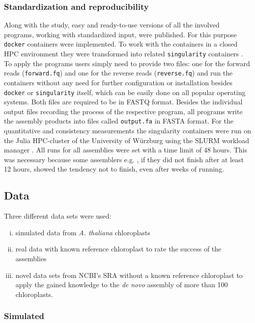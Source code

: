 \subsubsection{Standardization and reproducibility}

Along with the study, easy and ready-to-use versions of all the involved programs, working
with standardized input, were published. For this purpose \texttt{docker} containers
\cite{merkel2014docker} were implemented. To work with the containers in a closed HPC
environment they were transformed into related \texttt{singularity} containers
\cite{kurtzer2017singularity}. To apply the programs users simply need to provide two files:
one for the forward reads (\texttt{forward.fq}) and one for the reverse reads
(\texttt{reverse.fq}) and run the containers without any need for further configuration or
installation besides \texttt{docker} or \texttt{singularity} itself, which can be easily
done on all popular operating systems. Both files are required to be in FASTQ
format. Besides the individual output files recording the process of the respective
program, all programs write the assembly products into files called \texttt{output.fa} in
FASTA format. For the quantitative and consistency measurements the singularity containers
were run on the Julia HPC-cluster of the University of W\"{u}rzburg using the SLURM
workload manager \cite{Jette02slurm}. All runs for all assemblies were set with a time
limit of 48 hours. This was necessary because some assemblers e.g. \ioga, if they did not finish
after at least 12 hours, showed the tendency not to finish, even after weeks of running.

\subsection{Data}
Three different data sets were used:
\begin{enumerate}[(i)]
\item simulated data from \textit{A. thaliana} chloroplasts 
\item real data with known reference chloroplast to rate the success of the assemblies 
\item novel data sets from NCBI's SRA without a known reference chloroplast to apply the
  gained knowledge to the \textit{de novo} assembly of more than 100 chloroplasts.
\end{enumerate}
\subsubsection{Simulated}

